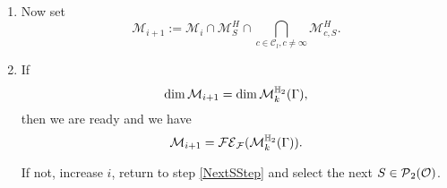 \begin{algo}
\begin{enumerate}
\item
Now set
\[ \mathcal{M}_{i+1} := \mathcal{M}_i \cap \mathcal{M}^H_S \cap \bigcap_{c \in \mathcal{C}_l, c \ne \infty} \mathcal{M}^H_{c,S} . \]
%
%
%
%
%

\item
If
\[ \dim \mathcal{M}_{i+1} = \dim \operatorname{\mathcal{M}}^{\mathbb{H}_{2}}_{k} (\Gamma) , \]
then we are ready and we have
\[ \mathcal{M}_{i+1} = \mathcal{FE}_{\mathcal{F}}(\operatorname{\mathcal{M}}^{\mathbb{H}_{2}}_{k} (\Gamma)) . \]

If not, increase $i$, return to step \ref{NextSStep} and select the next $S \in \operatorname{\mathcal{P}}_2(\mathcal{O})$.
\end{enumerate}
\end{algo}

